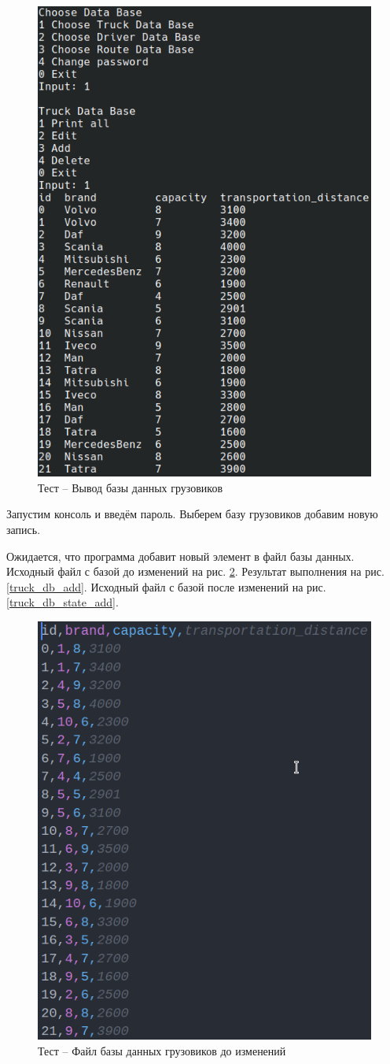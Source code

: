 \begin{figure}[H]
	\centering
	\includegraphics[width=0.7\linewidth]{photo/tests/admin/truck_db_print}
	\caption{Тест -- Вывод базы данных грузовиков}
	\label{truck_db_print}
\end{figure}

Запустим консоль и введём пароль. Выберем базу грузовиков добавим новую запись.

Ожидается, что программа добавит новый элемент в файл базы данных.
Исходный файл с базой до изменений на рис. \ref{truck_db_state_init2}.
Результат выполнения на рис. \ref{truck_db_add}.
Исходный файл с базой после изменений на рис. \ref{truck_db_state_add}.

\begin{figure}[H]
	\centering
	\includegraphics[width=0.4\linewidth]{photo/tests/admin/truck_db_state_init}
	\caption{Тест -- Файл базы данных грузовиков до изменений}
	\label{truck_db_state_init2}
\end{figure}

